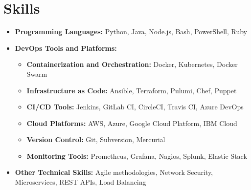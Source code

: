 \documentclass[a4paper,10pt]{article}
\begin{document}
\section*{Skills}
\begin{itemize}
  \item \textbf{Programming Languages:} Python, Java, Node.js, Bash, PowerShell, Ruby
  \item \textbf{DevOps Tools and Platforms:} 
        \begin{itemize}
            \item \textbf{Containerization and Orchestration:} Docker, Kubernetes, Docker Swarm
            \item \textbf{Infrastructure as Code:} Ansible, Terraform, Pulumi, Chef, Puppet
            \item \textbf{CI/CD Tools:} Jenkins, GitLab CI, CircleCI, Travis CI, Azure DevOps
            \item \textbf{Cloud Platforms:} AWS, Azure, Google Cloud Platform, IBM Cloud
            \item \textbf{Version Control:} Git, Subversion, Mercurial
            \item \textbf{Monitoring Tools:} Prometheus, Grafana, Nagios, Splunk, Elastic Stack
        \end{itemize}
  \item \textbf{Other Technical Skills:} Agile methodologies, Network Security, Microservices, REST APIs, Load Balancing
\end{itemize}
\end{document}
